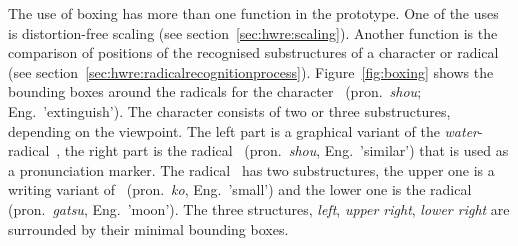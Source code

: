 The use of boxing has more than one function in the prototype. One of the uses 
is distortion-free scaling (see section~\ref{sec:hwre:scaling}). Another function
is the comparison of positions of the recognised substructures of a character 
or radical (see section~\ref{sec:hwre:radicalrecognitionprocess}).
Figure~\ref{fig:boxing} shows the bounding boxes around the radicals for
the character~ (pron.\ \emph{shou}; Eng.\ 'extinguish'). The character 
consists of two or three substructures, depending on the viewpoint. 
The left part is a graphical variant of the \emph{water}-radical~, 
the right part is the radical~ (pron.\ \emph{shou}, Eng.\ 'similar') 
that is used as a pronunciation marker.
The radical~ has two substructures, the upper one is a writing
variant of~ (pron.\ \emph{ko}, Eng.\ 'small') and the lower one is the 
radical~ (pron.\ \emph{gatsu}, Eng.\ 'moon'). The three structures,
\emph{left}, \emph{upper right}, \emph{lower right} are surrounded by their
minimal bounding boxes.
